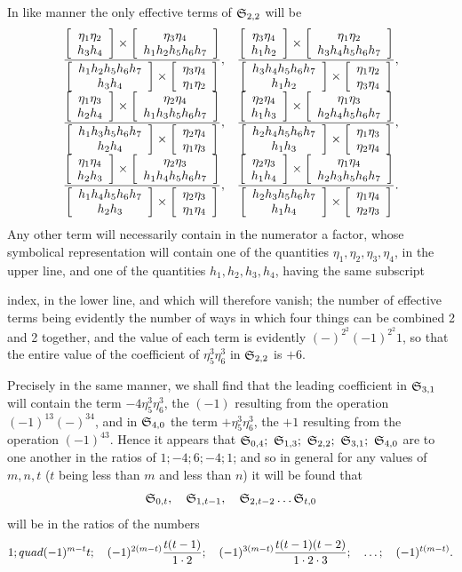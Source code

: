 \documentclass[11pt]{article}
\newcommand{\sourcepage}[1]{\marginpar{\scriptsize p.~#1}}
\begin{document}
In like manner the only effective terms of $\mathfrak{S}_{2,2}$ will be
\begingroup\scriptsize
\[
\begin{array}{ccc}
\displaystyle \frac{\left[\begin{array}{c}\eta_1\eta_2\\h_3h_4\end{array}\right]\times\left[\begin{array}{c}\eta_3\eta_4\\h_1h_2h_5h_6h_7\end{array}\right]}{\left[\begin{array}{c}h_1h_2h_5h_6h_7\\h_3h_4\end{array}\right]\times\left[\begin{array}{c}\eta_3\eta_4\\\eta_1\eta_2\end{array}\right]},
&
\displaystyle \frac{\left[\begin{array}{c}\eta_3\eta_4\\h_1h_2\end{array}\right]\times\left[\begin{array}{c}\eta_1\eta_2\\h_3h_4h_5h_6h_7\end{array}\right]}{\left[\begin{array}{c}h_3h_4h_5h_6h_7\\h_1h_2\end{array}\right]\times\left[\begin{array}{c}\eta_1\eta_2\\\eta_3\eta_4\end{array}\right]},\\[1.2em]
\displaystyle \frac{\left[\begin{array}{c}\eta_1\eta_3\\h_2h_4\end{array}\right]\times\left[\begin{array}{c}\eta_2\eta_4\\h_1h_3h_5h_6h_7\end{array}\right]}{\left[\begin{array}{c}h_1h_3h_5h_6h_7\\h_2h_4\end{array}\right]\times\left[\begin{array}{c}\eta_2\eta_4\\\eta_1\eta_3\end{array}\right]},
&
\displaystyle \frac{\left[\begin{array}{c}\eta_2\eta_4\\h_1h_3\end{array}\right]\times\left[\begin{array}{c}\eta_1\eta_3\\h_2h_4h_5h_6h_7\end{array}\right]}{\left[\begin{array}{c}h_2h_4h_5h_6h_7\\h_1h_3\end{array}\right]\times\left[\begin{array}{c}\eta_1\eta_3\\\eta_2\eta_4\end{array}\right]},\\[1.2em]
\displaystyle \frac{\left[\begin{array}{c}\eta_1\eta_4\\h_2h_3\end{array}\right]\times\left[\begin{array}{c}\eta_2\eta_3\\h_1h_4h_5h_6h_7\end{array}\right]}{\left[\begin{array}{c}h_1h_4h_5h_6h_7\\h_2h_3\end{array}\right]\times\left[\begin{array}{c}\eta_2\eta_3\\\eta_1\eta_4\end{array}\right]},
&
\displaystyle \frac{\left[\begin{array}{c}\eta_2\eta_3\\h_1h_4\end{array}\right]\times\left[\begin{array}{c}\eta_1\eta_4\\h_2h_3h_5h_6h_7\end{array}\right]}{\left[\begin{array}{c}h_2h_3h_5h_6h_7\\h_1h_4\end{array}\right]\times\left[\begin{array}{c}\eta_1\eta_4\\\eta_2\eta_3\end{array}\right]}.
\end{array}
\]
\endgroup
Any other term will necessarily contain in the numerator a factor, whose symbolical representation will contain one of the quantities $\eta_1,\eta_2,\eta_3,\eta_4$, in the upper line, and one of the quantities $h_1,h_2,h_3,h_4$, having the same subscript

\sourcepage{474}
index, in the lower line, and which will therefore vanish; the number of effective terms being evidently the number of ways in which four things can be combined 2 and 2 together, and the value of each term is evidently $(-)^{2^2}(-1)^{2^2}1$, so that the entire value of the coefficient of $\eta_5^3\eta_6^3$ in $\mathfrak{S}_{2,2}$ is $+6$.

Precisely in the same manner, we shall find that the leading coefficient in $\mathfrak{S}_{3,1}$ will contain the term $-4\eta_5^3\eta_6^3$, the $(-1)$ resulting from the operation $(-1)^{13}(-)^{34}$, and in $\mathfrak{S}_{4,0}$ the term $+\eta_5^3\eta_6^3$, the $+1$ resulting from the operation $(-1)^{43}$. Hence it appears that $\Syz_{0,4};\ \Syz_{1,3};\ \Syz_{2,2};\ \Syz_{3,1};\ \Syz_{4,0}$ are to one another in the ratios of $1;-4;6;-4;1$; and so in general for any values of $m,n,t$ ($t$ being less than $m$ and less than $n$) it will be found that
\[
\mathfrak{S}_{0,t},\quad \mathfrak{S}_{1,t-1},\quad \mathfrak{S}_{2,t-2}\ldots\mathfrak{S}_{t,0}
\]
will be in the ratios of the numbers
\[
1;\\quad (-1)^{m-t}t;\quad
(-1)^{2(m-t)}\frac{t(t-1)}{1\cdot2};\quad
(-1)^{3(m-t)}\frac{t(t-1)(t-2)}{1\cdot2\cdot3};\quad\ldots;\quad
(-1)^{t(m-t)}.
\]
\end{document}
